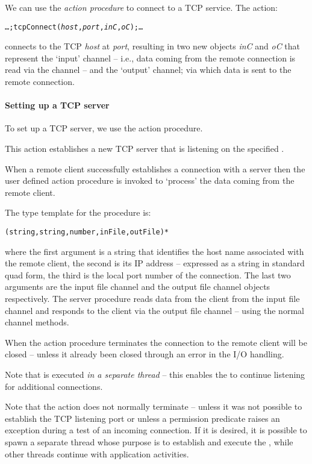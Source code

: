 We can use the  \emph{action procedure} to connect to a TCP service. The action:
\begin{alltt}
\ldots; tcpConnect(\emph{host},\emph{port},\emph{inC},\emph{oC});\ldots
\end{alltt}
connects to the TCP \emph{host} at \emph{port}, resulting in two new objects \emph{inC} and \emph{oC} that represent the `input' channel -- i.e., data coming from the remote connection is read via the  channel -- and the `output' channel; via which data is sent to the remote connection.


\paragraph{Setting up a TCP server}

To set up a TCP server, we use the  action procedure.


This action establishes a new TCP server that is listening on the specified . 

When a remote client successfully establishes a connection with a \go server then the user defined  action procedure is invoked to `process' the data coming from the remote client.

The type template for the  procedure is:
\begin{alltt}
(string,string,number,inFile,outFile)*
\end{alltt}
where the first argument is a string that identifies the host name associated with the remote client, the second is its IP address -- expressed as a string in standard quad form, the third is the local port number of the connection. The last two arguments are the input file channel and the output file channel objects respectively. The server procedure reads data from the client from the input file channel and responds to the client via the output file channel -- using the normal channel methods.

When the  action procedure terminates the connection to the remote client will be closed -- unless it already been closed through an error in the I/O handling.

Note that  is executed \emph{in a separate thread} -- this enables the  to continue listening for additional connections.

Note that the  action does not normally terminate -- unless it was not possible to establish the TCP listening port or unless a permission predicate raises an exception during a test of an incoming connection. If it is desired, it is possible to spawn a separate thread whose purpose is to establish and execute the , while other threads continue with application activities.
